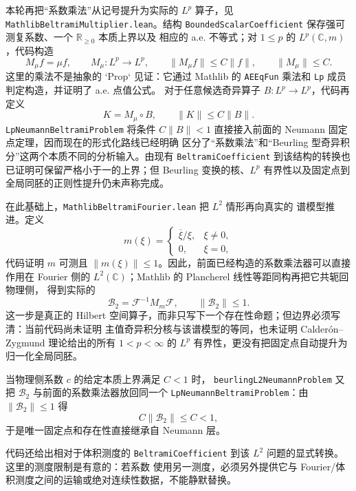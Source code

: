 \documentclass[UTF8,fontset=none,a4paper,11pt]{ctexart}
\begin{document}
本轮再把“系数乘法”从记号提升为实际的 \(L^p\) 算子，见
\texttt{MathlibBeltramiMultiplier}\allowbreak\texttt{.lean}。结构
\texttt{BoundedScalarCoefficient} 保存强可测复系数、一个 \(\mathbb R_{\ge 0}\) 本质上界以及
相应的 a.e. 不等式；对 \(1\le p\) 的 \(L^p(\mathbb C,m)\)，代码构造
\[
 M_\mu f=\mu f,
 \qquad
 M_\mu:L^p\longrightarrow L^p,
 \qquad
 \lVert M_\mu f\rVert\leq C\lVert f\rVert,
 \qquad
 \lVert M_\mu\rVert\leq C.
\]
这里的乘法不是抽象的 `Prop` 见证：它通过 Mathlib 的
\texttt{AEEqFun} 乘法和 \texttt{Lp} 成员判定构造，并证明了 a.e. 点值公式。
对于任意候选奇异算子 \(B:L^p\to L^p\)，代码再定义
\[
 K=M_\mu\circ B,
 \qquad
 \lVert K\rVert\leq C\lVert B\rVert.
\]
\texttt{LpNeumannBeltramiProblem} 将条件
\(C\lVert B\rVert<1\) 直接接入前面的 Neumann 固定点定理，因而现在的形式化路线已经明确
区分了“系数乘法”和“Beurling 型奇异积分”这两个本质不同的分析输入。由现有
\texttt{BeltramiCoefficient} 到该结构的转换也已证明可保留严格小于一的上界；但
Beurling 变换的核、\(L^p\) 有界性以及固定点到全局同胚的正则性提升仍未声称完成。

在此基础上，\texttt{MathlibBeltramiFourier}\allowbreak\texttt{.lean} 把 \(L^2\) 情形再向真实的
谱模型推进。定义
\[
 m(\xi)=
 \begin{cases}
 \overline{\xi}/\xi,&\xi\ne0,\\
 0,&\xi=0,
 \end{cases}
\]
代码证明 \(m\) 可测且 \(\lVert m(\xi)\rVert\leq1\)。因此，前面已经构造的系数乘法器可以直接
作用在 Fourier 侧的 \(L^2(\mathbb C)\)；Mathlib 的 Plancherel 线性等距同构再把它共轭回物理侧，
得到实际的
\[
 \mathcal B_2=\mathcal F^{-1}M_m\mathcal F,
 \qquad
 \lVert\mathcal B_2\rVert\leq1.
\]
这一步是真正的 Hilbert 空间算子，而非只写下一个存在性命题；但边界必须写清：当前代码尚未证明
主值奇异积分核与该谱模型的等同，也未证明 Calderón--Zygmund 理论给出的所有
\(1<p<\infty\) 的 \(L^p\) 有界性，更没有把固定点自动提升为归一化全局同胚。

当物理侧系数 \(c\) 的给定本质上界满足 \(C<1\) 时，
\texttt{beurlingL2NeumannProblem} 又把 \(\mathcal B_2\) 与前面的系数乘法器放回同一个
\texttt{LpNeumannBeltramiProblem}：由 \(\lVert\mathcal B_2\rVert\leq1\) 得
\[
 C\lVert\mathcal B_2\rVert\leq C<1,
\]
于是唯一固定点和存在性直接继承自 Neumann 层。\par
代码还给出相对于体积测度的
\texttt{BeltramiCoefficient} 到该 \(L^2\) 问题的显式转换。这里的测度限制是有意的：若系数
使用另一测度，必须另外提供它与 Fourier/体积测度之间的运输或绝对连续性数据，不能静默替换。
\end{document}
